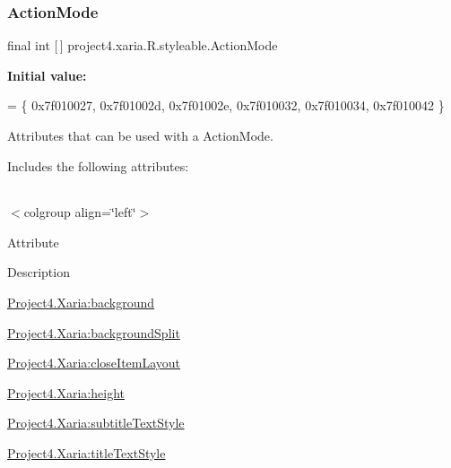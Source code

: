 \subsubsection{\texorpdfstring{Action\+Mode}{ActionMode}}
{\footnotesize\ttfamily final int \mbox{[}$\,$\mbox{]} project4.\+xaria.\+R.\+styleable.\+Action\+Mode\hspace{0.3cm}{\ttfamily [static]}}

{\bfseries Initial value\+:}
\begin{DoxyCode}
= \{
            0x7f010027, 0x7f01002d, 0x7f01002e, 0x7f010032,
            0x7f010034, 0x7f010042
        \}
\end{DoxyCode}
Attributes that can be used with a Action\+Mode. 

Includes the following attributes\+:

\tabulinesep=1mm
\begin{longtabu} spread 0pt [c]{*{0}{|X[-1]}|}
\hline
\end{longtabu}
$<$colgroup align=\char`\"{}left\char`\"{}$>$ 

Attribute

Description 

{\ttfamily \hyperlink{classproject4_1_1xaria_1_1R_1_1styleable_ab1a261ccff970c0b57e913757843250e}{Project4.\+Xaria\+:background}}

{\ttfamily \hyperlink{classproject4_1_1xaria_1_1R_1_1styleable_a682593862d08e03c043a7c9005f99110}{Project4.\+Xaria\+:background\+Split}}

{\ttfamily \hyperlink{classproject4_1_1xaria_1_1R_1_1styleable_a63d571b40c30f57b55825bd03e4d00dc}{Project4.\+Xaria\+:close\+Item\+Layout}}

{\ttfamily \hyperlink{classproject4_1_1xaria_1_1R_1_1styleable_a7ca5db9c9a43d5a29fd3ede3ad0266cd}{Project4.\+Xaria\+:height}}

{\ttfamily \hyperlink{classproject4_1_1xaria_1_1R_1_1styleable_a1883dbad4265d780ae2a5d8c6b695982}{Project4.\+Xaria\+:subtitle\+Text\+Style}}

{\ttfamily \hyperlink{classproject4_1_1xaria_1_1R_1_1styleable_ac6453b7ab2d44d00d3056c12483f92cb}{Project4.\+Xaria\+:title\+Text\+Style}}

